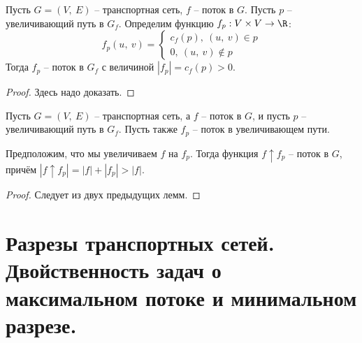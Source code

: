 \documentclass[a4paper,12pt]{article}
\begin{document}
\begin{fulllemma}
Пусть $G = (V,\ E)$ -- транспортная сеть, $f$ -- поток в $G$. Пусть $p$ -- увеличивающий путь в $G_f$. Определим функцию $f_p : V \times V \to \R$: \[f_p(u,\ v) = \begin{cases}c_f(p),\ (u,\ v) \in p\\ 0,\ (u,\ v) \notin p\end{cases}\]
Тогда $f_p$ -- поток в $G_f$ с величиной $|f_p| = c_f(p) > 0$.
\end{fulllemma}
\begin{proof}
 Здесь надо доказать.
\end{proof}
\begin{consequence}
 Пусть $G = (V,\ E)$ -- транспортная сеть, а $f$ -- поток в $G$, и пусть $p$ -- увеличивающий путь в $G_f$. Пусть также $f_p$ -- поток в увеличивающем пути.
 
 Предположим, что мы увеличиваем $f$ на $f_p$. Тогда функция $f\uparrow f_p$ -- поток в $G$, причём $|f\uparrow f_p| = |f| + |f_p| > |f|$.
\end{consequence}
\begin{proof}
    Следует из двух предыдущих лемм.
\end{proof}
\newpage
\section{Разрезы транспортных сетей. Двойственность задач о максимальном потоке и минимальном разрезе.}
\end{document}
